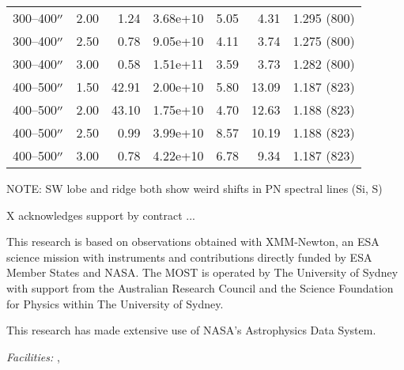 \documentclass[preprint2,tighten,trackchanges]{aastex6}
\begin{document}
\begin{table*}
\begin{tabular}{@{}lrrrrrr@{}}
        300--400$\mbox{$^{\prime\prime}$}$ & 2.00 & 1.24 & 3.68e+10 & 5.05 & 4.31 & 1.295 (800) \\  %
        300--400$\mbox{$^{\prime\prime}$}$ & 2.50 & 0.78 & 9.05e+10 & 4.11 & 3.74 & 1.275 (800) \\  %
        300--400$\mbox{$^{\prime\prime}$}$ & 3.00 & 0.58 & 1.51e+11 & 3.59 & 3.73 & 1.282 (800) \\  %
        \midrule
        400--500$\mbox{$^{\prime\prime}$}$ & 1.50 & 42.91 & 2.00e+10 & 5.80 & 13.09 & 1.187 (823) \\  %
        400--500$\mbox{$^{\prime\prime}$}$ & 2.00 & 43.10 & 1.75e+10 & 4.70 & 12.63 & 1.188 (823) \\  %
        400--500$\mbox{$^{\prime\prime}$}$ & 2.50 & 0.99 & 3.99e+10 & 8.57 & 10.19 & 1.188 (823) \\  %
        400--500$\mbox{$^{\prime\prime}$}$ & 3.00 & 0.78 & 4.22e+10 & 6.78 & 9.34 & 1.187 (823) \\  %
        \bottomrule
    \end{tabular}
\end{table*}




NOTE: SW lobe and ridge both show weird shifts in PN spectral lines (Si, S)


\acknowledgments

X acknowledges support by contract ...

This research is based on observations obtained with XMM-Newton, an ESA science
mission with instruments and contributions directly funded by ESA Member States
and NASA.
The MOST is operated by The University of Sydney with support from the
Australian Research Council and the Science Foundation for Physics within The
University of Sydney.

This research has made extensive use of NASA's Astrophysics Data System.

{\it Facilities:} , 





%

\end{document}
